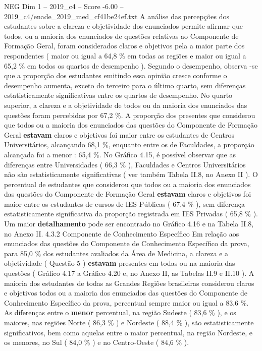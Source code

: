 \begin{textsample}{NEG Dim 1 – 2019\_c4 – Score -6.00 – 2019\_c4/enade\_2019\_med\_cf41be24ef.txt}
A análise das percepções dos estudantes sobre a clareza e objetividade dos enunciados permite afirmar que todos, ou a maioria dos enunciados de questões relativas ao Componente de Formação Geral, foram considerados claros e objetivos pela a maior parte dos respondentes ( maior ou igual a 64,8 \% em todas as regiões e maior ou igual a 65,2 \% em todos os quartos de desempenho ).
Segundo o desempenho, observa -se que a proporção dos estudantes emitindo essa opinião cresce conforme o desempenho aumenta, exceto do terceiro para o último quarto, sem diferenças estatisticamente significativas entre os quartos de desempenho.
No quarto superior, a clareza e a objetividade de todos ou da maioria dos enunciados das questões foram percebidas por 67,2 \%.
A proporção dos presentes que considerou que todos ou a maioria dos enunciados das questões do Componente de Formação Geral \textbf{estavam} claros e objetivos foi maior entre os estudantes de Centros Universitários, alcançando 68,1 \%, enquanto entre os de Faculdades, a proporção alcançada foi a menor : 65,4 \%.
No Gráfico 4.15, é possível observar que as diferenças entre Universidades ( 66,3 \% ), Faculdades e Centros Universitários não são estatisticamente significativas ( ver também Tabela II.8, no Anexo II ).
O percentual de estudantes que considerou que todos ou a maioria dos enunciados das questões do Componente de Formação Geral \textbf{estavam} claros e objetivos foi maior entre os estudantes de cursos de IES Públicas ( 67,4 \% ), sem diferença estatisticamente significativa da proporção registrada em IES Privadas ( 65,8 \% ).
Um maior \textbf{detalhamento} pode ser encontrado no Gráfico 4.16 e na Tabela II.8, no Anexo II. 4.3.2 Componente de Conhecimento Específico Em relação aos enunciados das questões do Componente de Conhecimento Específico da prova, para 85,0 \% dos estudantes avaliados da Área de Medicina, a clareza e a objetividade ( Questão 5 ) \textbf{estavam} presentes em todas ou na maioria das questões ( Gráfico 4.17 a Gráfico 4.20 e, no Anexo II, as Tabelas II.9 e II.10 ).
A maioria dos estudantes de todas as Grandes Regiões brasileiras considerou claros e objetivos todos ou a maioria dos enunciados das questões do Componente de Conhecimento Específico da prova, percentual sempre maior ou igual a 83,6 \%.
As diferenças entre o \textbf{menor} percentual, na região Sudeste ( 83,6 \% ), e os maiores, nas regiões Norte ( 86,3 \% ) e Nordeste ( 88,4 \% ), são estatisticamente significativos, bem como aquelas entre o maior percentual, na região Nordeste, e os menores, no Sul ( 84,0 \% ) e no Centro-Oeste ( 84,6 \% ).

\end{textsample}
